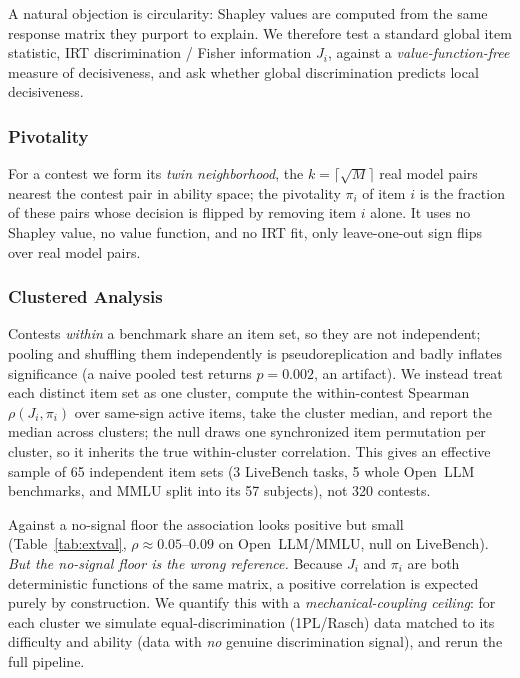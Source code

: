 \documentclass[conference]{IEEEtran}
\begin{document}
A natural objection is circularity: Shapley values are computed from the same response matrix they purport to explain.
We therefore test a standard global item statistic, IRT discrimination / Fisher information $J_i$, against a \emph{value-function-free} measure of decisiveness, and ask whether global discrimination predicts local decisiveness.

\subsubsection{Pivotality}
For a contest we form its \emph{twin neighborhood}, the $k=\lceil\sqrt{M}\rceil$ real model pairs nearest the contest pair in ability space; the pivotality $\pi_i$ of item $i$ is the fraction of these pairs whose decision is flipped by removing item $i$ alone.
It uses no Shapley value, no value function, and no IRT fit, only leave-one-out sign flips over real model pairs.

\subsubsection{Clustered Analysis}
Contests \emph{within} a benchmark share an item set, so they are not independent; pooling and shuffling them independently is pseudoreplication and badly inflates significance (a naive pooled test returns $p=0.002$, an artifact).
We instead treat each distinct item set as one cluster, compute the within-contest Spearman $\rho(J_i,\pi_i)$ over same-sign active items, take the cluster median, and report the median across clusters; the null draws one synchronized item permutation per cluster, so it inherits the true within-cluster correlation.
This gives an effective sample of 65 independent item sets (3 LiveBench tasks, 5 whole Open~LLM benchmarks, and MMLU split into its 57 subjects), not 320 contests.

Against a no-signal floor the association looks positive but small (Table~\ref{tab:extval}, $\rho\approx0.05$--$0.09$ on Open~LLM/MMLU, null on LiveBench).
\emph{But the no-signal floor is the wrong reference.}
Because $J_i$ and $\pi_i$ are both deterministic functions of the same matrix, a positive correlation is expected purely by construction.
We quantify this with a \emph{mechanical-coupling ceiling}: for each cluster we simulate equal-discrimination (1PL/Rasch) data matched to its difficulty and ability (data with \emph{no} genuine discrimination signal), and rerun the full pipeline.
\end{document}
